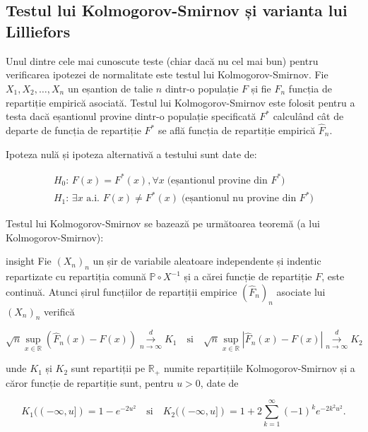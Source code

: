 \documentclass[]{article}
\newenvironment{frshaded_insight*}{%
  \def\FrameCommand{\fboxrule=\FrameRule\fboxsep=\FrameSep \fcolorbox{framecolor_insight}{shadecolor_insight}}%
  \MakeFramed {\advance\hsize-\width \FrameRestore}}%
{\endMakeFramed}
\newenvironment{rmdblock_insight}[1]
  {\begin{frshaded_insight*}
  \begin{itemize}
  \renewcommand{\labelitemi}{
    \raisebox{-.7\height}[0pt][0pt]{
      {\setkeys{Gin}{width=2em,keepaspectratio}\texttt{[image: images/icons/\#1]}}
    }
  }
  \item
  }
  {
  \end{itemize}
  \end{frshaded_insight*}
  }
\newenvironment{rmdinsight}
  {\begin{rmdblock_insight}{insight}}
  {\end{rmdblock_insight}}
\begin{document}
\subsection{Testul lui Kolmogorov-Smirnov și varianta lui
Lilliefors}\label{testul-lui-kolmogorov-smirnov-si-varianta-lui-lilliefors}

Unul dintre cele mai cunoscute teste (chiar dacă nu cel mai bun) pentru
verificarea ipotezei de normalitate este testul lui Kolmogorov-Smirnov.
Fie \(X_1, X_2, \ldots, X_n\) un eșantion de talie \(n\) dintr-o
populație \(F\) și fie \(\hat{F}_n\) funcția de repartiție empirică
asociată. Testul lui Kolmogorov-Smirnov este folosit pentru a testa dacă
eșantionul provine dintr-o populație specificată \(F^*\) calculând cât
de departe de funcția de repartiție \(F^*\) se află funcția de
repartiție empirică \(\hat{F}_n\).

Ipoteza nulă și ipoteza alternativă a testului sunt date de:

\[
\begin{array}{ll}
  H_0:\, F(x) = F^*(x), \forall x\; \text{(eșantionul provine din $F^*$)}\\
  H_1:\, \exists x \text{ a.i. } F(x) \neq F^*(x) \; \text{(eșantionul nu provine din $F^*$)}
\end{array}
\]

Testul lui Kolmogorov-Smirnov se bazează pe următoarea teoremă (a lui
Kolmogorov-Smirnov):

\begin{rmdinsight}
Fie \((X_n)_n\) un șir de variabile aleatoare independente și indentic
repartizate cu repartiția comună \(\mathbb{P}\circ X^{-1}\) și a cărei
funcție de repartiție \(F\), este continuă. Atunci șirul funcțiilor de
repartiții empirice \((\hat{F}_n)_n\) asociate lui \((X_n)_n\) verifică

\[
  \sqrt{n}\sup_{x\in\mathbb{R}}\left(\hat{F}_n(x) - F(x)\right) \overset{d}{\underset{n\to\infty}{\longrightarrow}} K_1 \quad \text{si} \quad \sqrt{n}\sup_{x\in\mathbb{R}}\left|\hat{F}_n(x) - F(x)\right| \overset{d}{\underset{n\to\infty}{\longrightarrow}} K_2
\]

unde \(K_1\) și \(K_2\) sunt repartiții pe \(\mathbb{R}_+\) numite
repartițiile Kolmogorov-Smirnov și a căror funcție de repartiție sunt,
pentru \(u>0\), date de

\[
  K_1((-\infty, u]) = 1 - e^{-2u^2} \quad \text{si} \quad  K_2((-\infty, u]) = 1+2\sum_{k=1}^{\infty}(-1)^ke^{-2k^2u^2}. 
\]
\end{rmdinsight}
\end{document}
